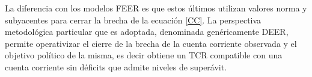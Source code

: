 \documentclass[12pt,letterpaper]{article}
\begin{document}
La diferencia con los modelos FEER es que estos últimos utilizan valores norma y subyacentes para cerrar la brecha de la ecuación \ref{CC}. La perspectiva metodológica particular que es adoptada, denominada genéricamente DEER, permite operativizar el cierre de la brecha de la cuenta corriente observada y el objetivo político de la misma, es decir obtiene un TCR compatible con una cuenta corriente sin déficits que admite niveles de superávit.


\end{document}
